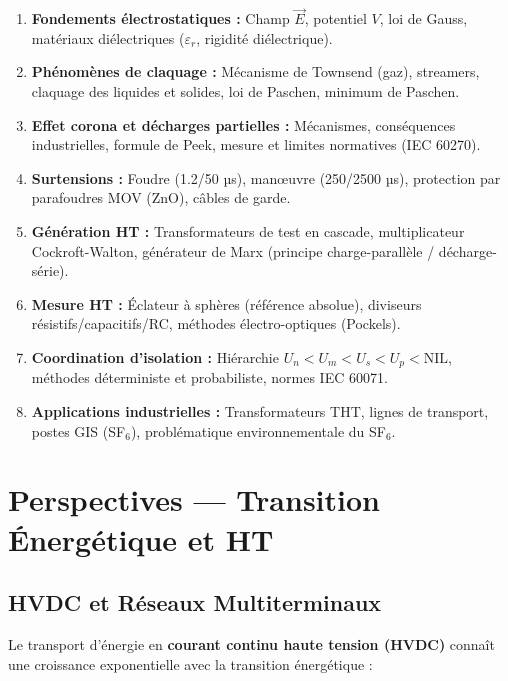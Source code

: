 \documentclass[12pt, a4paper, twoside]{report}
\begin{document}
\begin{enumerate}
  \item \textbf{Fondements électrostatiques :} Champ $\vec{E}$, potentiel $V$, loi de Gauss,
    matériaux diélectriques ($\varepsilon_r$, rigidité diélectrique).

  \item \textbf{Phénomènes de claquage :} Mécanisme de Townsend (gaz), streamers,
    claquage des liquides et solides, loi de Paschen, minimum de Paschen.

  \item \textbf{Effet corona et décharges partielles :} Mécanismes, conséquences industrielles,
    formule de Peek, mesure et limites normatives (IEC 60270).

  \item \textbf{Surtensions :} Foudre (1.2/50 µs), manœuvre (250/2500 µs),
    protection par parafoudres MOV (ZnO), câbles de garde.

  \item \textbf{Génération HT :} Transformateurs de test en cascade, multiplicateur
    Cockroft-Walton, générateur de Marx (principe charge-parallèle / décharge-série).

  \item \textbf{Mesure HT :} Éclateur à sphères (référence absolue), diviseurs
    résistifs/capacitifs/RC, méthodes électro-optiques (Pockels).

  \item \textbf{Coordination d'isolation :} Hiérarchie $U_n < U_m < U_s < U_p < \text{NIL}$,
    méthodes déterministe et probabiliste, normes IEC 60071.

  \item \textbf{Applications industrielles :} Transformateurs THT, lignes de transport,
    postes GIS (SF$_6$), problématique environnementale du SF$_6$.
\end{enumerate}

\section{Perspectives — Transition Énergétique et HT}

\subsection{HVDC et Réseaux Multiterminaux}

Le transport d'énergie en \textbf{courant continu haute tension (HVDC)} connaît
une croissance exponentielle avec la transition énergétique :
\end{document}
